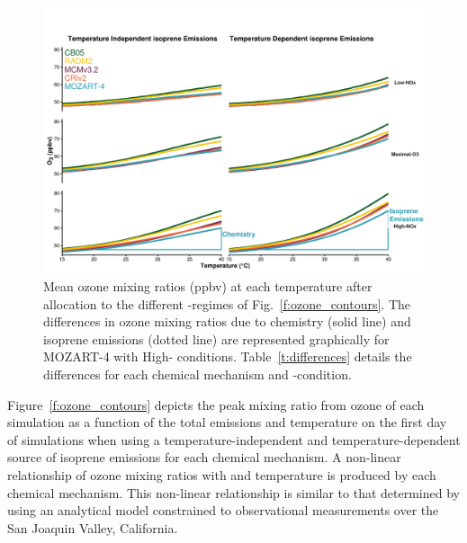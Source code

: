 \begin{figure}[t]%
    \centering%
    \caption{Mean ozone mixing ratios (ppbv) at each temperature after allocation to the different -regimes of Fig.~\ref{f:ozone_contours}. The differences in ozone mixing ratios due to chemistry (solid line) and isoprene emissions (dotted line) are represented graphically for MOZART-4 with High- conditions. Table~\ref{t:differences} details the differences for each chemical mechanism and -condition.}%
    \label{f:O3-T}%
    \includegraphics[width=\textwidth]{img/O3-T_correlation}%
    \vspace{-4mm}
\end{figure}

\begin{table}[t]%
    \centering%
    \caption{Increase in mean ozone mixing ratio (ppbv) due to chemistry (i.e. faster reaction rates) and temperature-dependent isoprene emissions from $20$~\degree C to $40$~\degree C in the -regimes of Fig.~\ref{f:O3-T}.}%
    \label{t:differences}%
    \vspace{-4mm}
\end{table}

Figure~\ref{f:ozone_contours} depicts the peak mixing ratio from ozone of each simulation as a function of the total  emissions and temperature on the first day of simulations when using a temperature-independent and temperature-dependent source of isoprene emissions for each chemical mechanism.
A non-linear relationship of ozone mixing ratios with  and temperature is produced by each chemical mechanism.
This non-linear relationship is similar to that determined by \citet{Pusede:2014} using an analytical model constrained to observational measurements over the San Joaquin Valley, California.

